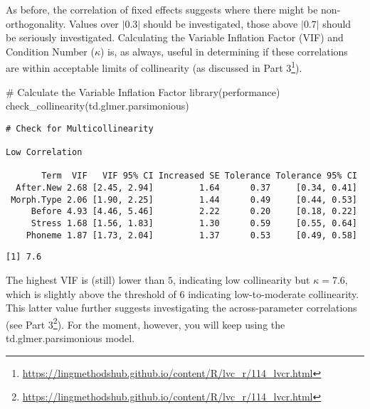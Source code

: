 \documentclass[
  10pt,
  letterpaper]{article}
\newenvironment{Shaded}{\begin{snugshade}}{\end{snugshade}}
\newcommand{\CommentTok}[1]{\textcolor[rgb]{0.37,0.37,0.37}{#1}}
\newcommand{\FunctionTok}[1]{\textcolor[rgb]{0.28,0.35,0.67}{#1}}
\newcommand{\NormalTok}[1]{\textcolor[rgb]{0.00,0.23,0.31}{#1}}
\newcommand{\SpecialCharTok}[1]{\textcolor[rgb]{0.37,0.37,0.37}{#1}}
\renewcommand\texttt[1]{{\ttfamily\color{BrickRed}#1}}
\DeclareRobustCommand{\href}[2]{#2\footnote{\url{#1}}}
\begin{document}
As before, the correlation of fixed effects suggests where there might
be non-orthogonality. Values over \(|0.3|\) should be investigated,
those above \(|0.7|\) should be seriously investigated. Calculating the
Variable Inflation Factor (VIF) and Condition Number (\(\kappa\)) is, as
always, useful in determining if these correlations are within
acceptable limits of collinearity (as discussed in
\href{https://lingmethodshub.github.io/content/R/lvc_r/114_lvcr.html}{Part
3}).

\begin{Shaded}
\begin{Highlighting}[]
\CommentTok{\# Calculate the Variable Inflation Factor}
\FunctionTok{library}\NormalTok{(performance)}
\FunctionTok{check\_collinearity}\NormalTok{(td.glmer.parsimonious)}
\end{Highlighting}
\end{Shaded}

\begin{verbatim}
# Check for Multicollinearity

Low Correlation

       Term  VIF   VIF 95% CI Increased SE Tolerance Tolerance 95% CI
  After.New 2.68 [2.45, 2.94]         1.64      0.37     [0.34, 0.41]
 Morph.Type 2.06 [1.90, 2.25]         1.44      0.49     [0.44, 0.53]
     Before 4.93 [4.46, 5.46]         2.22      0.20     [0.18, 0.22]
     Stress 1.68 [1.56, 1.83]         1.30      0.59     [0.55, 0.64]
    Phoneme 1.87 [1.73, 2.04]         1.37      0.53     [0.49, 0.58]
\end{verbatim}

\begin{Shaded}
\end{Shaded}

\begin{verbatim}
[1] 7.6
\end{verbatim}

The highest VIF is (still) lower than \(5\), indicating low collinearity
but \(\kappa = 7.6\), which is slightly above the threshold of \(6\)
indicating low-to-moderate collinearity. This latter value further
suggests investigating the across-parameter correlations (see
\href{https://lingmethodshub.github.io/content/R/lvc_r/114_lvcr.html}{Part
3}). For the moment, however, you will keep using the
\texttt{td.glmer.parsimonious} model.
\end{document}
